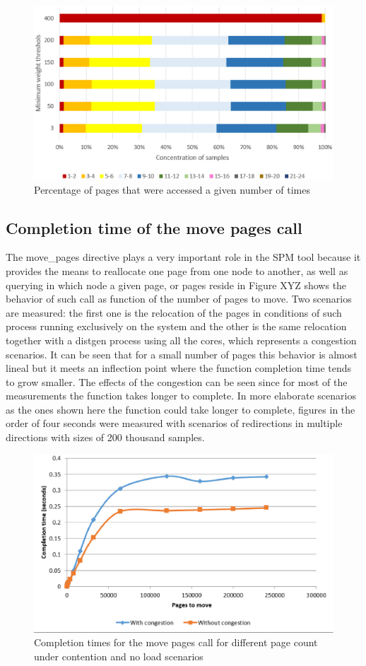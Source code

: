 \begin{figure}[th]
	\centering
		\includegraphics[width=.8\textwidth]{figures/sample-concentration.eps}
		\caption{Percentage of pages that were accessed a given number of times }
		\label{fig:pmu-concentsamp}
\end{figure}

\subsection{Completion time of the move pages call}\label{subsection:pmu-movpatime}


The move\_pages directive plays a very important role in the SPM tool because it provides the means to reallocate one page from one node to another, as well as querying in which node a given page, or pages reside in Figure XYZ shows the behavior of such call as function of the number of pages to move. Two scenarios are measured: the first one is the relocation of the pages in conditions of such process running exclusively on the system and the other is the same relocation together with a distgen process using all the cores, which represents a congestion scenarios. It can be seen that for a small number of pages this behavior is almost lineal but it meets an inflection point where the function completion time tends to grow smaller. The effects of the congestion can be seen since for most of the measurements the function takes longer to complete. In more elaborate scenarios as the ones shown here the function could take longer to complete, figures in the order of four seconds were measured with scenarios of redirections in multiple directions with sizes of 200 thousand samples.

\begin{figure}[th]  
	\centering
		\includegraphics[width=.8\textwidth]{figures/mov-pages-time.eps}
		\caption{Completion times for the move pages call for different page count under contention and no load scenarios}
		\label{fig:mov-pages-time.eps}
\end{figure}
